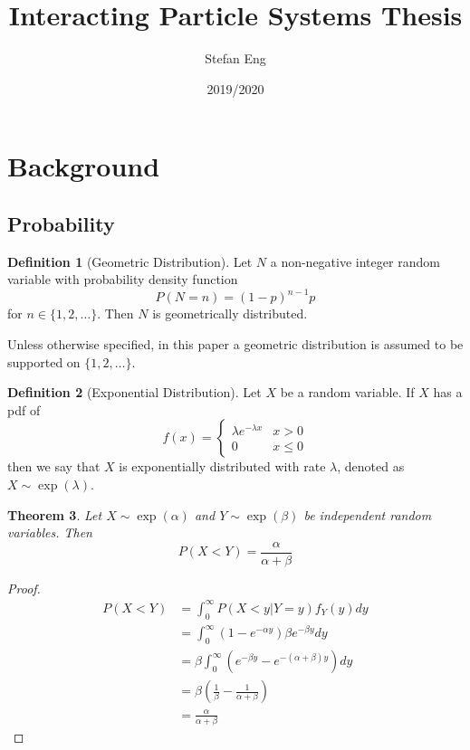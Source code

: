 \documentclass{article}
\title{Interacting Particle Systems Thesis}
\author{Stefan Eng}
\date{2019/2020}
\theoremstyle{plain}
\newtheorem{theorem}{Theorem}[section]
\theoremstyle{definition}
\newtheorem{defn}[theorem]{Definition}
\theoremstyle{remark}
\numberwithin{equation}{section}
\begin{document}
\maketitle

\section{Background}

\subsection{Probability}

\begin{defn}[Geometric Distribution]
Let $N$ a non-negative integer random variable with probability density function
$$
P(N = n) = (1 - p)^{n - 1} p
$$
for $n \in \{1,2,\ldots\}$.
Then $N$ is geometrically distributed.

Unless otherwise specified, in this paper a geometric distribution is assumed to be supported on $\{1,2,\ldots\}$.
\end{defn}

\begin{defn}[Exponential Distribution]
Let $X$ be a random variable.
If $X$ has a pdf of 
$$
f(x) = \begin{cases}
    \lambda e^{-\lambda x} & x > 0\\
    0 & x \leq 0
    \end{cases}
$$
then we say that $X$ is exponentially distributed with rate $\lambda$, denoted as $X \sim \exp(\lambda)$.
\end{defn}

\begin{theorem}\label{thm:exp_x_less_y}
Let $X \sim \exp(\alpha)$ and $Y \sim \exp(\beta)$ be independent random variables.
Then 
$$
P(X < Y) = \frac{\alpha}{\alpha + \beta}
$$
\end{theorem}

\begin{proof}
\begin{align*}
    P(X < Y) &= \int_0^\infty P(X < y | Y = y) f_Y(y) dy\\
    &= \int_0^\infty (1 - e^{-\alpha y}) \beta e^{-\beta y} dy\\
    &= \beta \int_0^\infty \left( e^{-\beta y} - e^{-(\alpha + \beta) y}\right) dy\\
    &= \beta \left(\frac{1}{\beta} - \frac{1}{\alpha + \beta}\right)\\
    &= \frac{\alpha}{\alpha + \beta}
\end{align*}
\end{proof}
\end{document}
